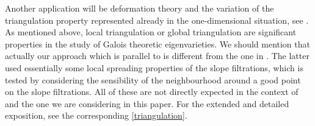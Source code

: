 \documentclass[12pt]{amsart}
\theoremstyle{definition}
\numberwithin{equation}{section}
\begin{document}
%
%
%
%
%
%
%
%
%
%
%
%
%



\indent Another application will be deformation theory and the variation of the triangulation property represented already in the one-dimensional situation, see \cite{KPX}. As mentioned above, local triangulation or global triangulation are significant properties in the study of Galois theoretic eigenvarieties. We should mention that actually our approach which is parallel to \cite{KPX} is different from the one in \cite{Liu1}. The latter used essentially some local spreading properties of the slope filtrations, which is tested by considering the sensibility of the neighbourhood around a good point on the slope filtrations. All of these are not directly expected in the context of \cite{KPX} and the one we are considering in this paper. For the extended and detailed exposition, see the corresponding \cref{triangulation}.\\
\end{document}

